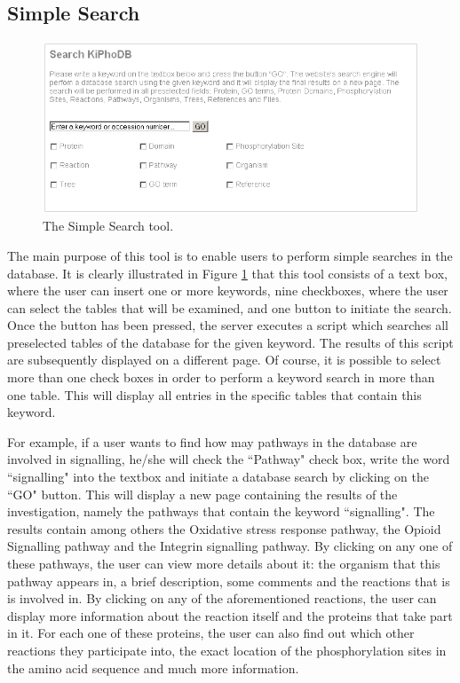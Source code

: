 \subsection{Simple Search}
\begin{figure}[htp]
\centering
\includegraphics[scale=0.6]{pictures/SimpleSearchTool.png}
\caption{The Simple Search tool.}
\label{simplesearchtool}
\end{figure}
The main purpose of this tool is to enable users to perform simple searches in the database.
It is clearly illustrated in Figure \ref{simplesearchtool} that this tool consists of a text box, where the user can insert one or more keywords, nine checkboxes, where the user can select the tables that will be examined, and one button to initiate the search.
Once the button has been pressed, the server executes a script which searches all preselected tables of the database for the given keyword.
The results of this script are subsequently displayed on a different page.
Of course, it is possible to select more than one check boxes in order to perform a keyword search in more than one table.
This will display all entries in the specific tables that contain this keyword.

For example, if a user wants to find how may pathways in the database are involved in signalling, he/she will check the ``Pathway" check box, write the word ``signalling" into the textbox and initiate a database search by clicking on the ``GO" button.
This will display a new page containing the results of the investigation, namely the pathways that contain the keyword ``signalling".
The results contain among others the Oxidative stress response pathway, the Opioid Signalling pathway and the Integrin signalling pathway.
By clicking on any one of these pathways, the user can view more details about it: the organism that this pathway appears in, a brief description, some comments and the reactions that is is involved in.
By clicking on any of the aforementioned reactions, the user can display more information about the reaction itself and the proteins that take part in it.
For each one of these proteins, the user can also find out which other reactions they participate into, the exact location of the phosphorylation sites in the amino acid sequence and much more information.

